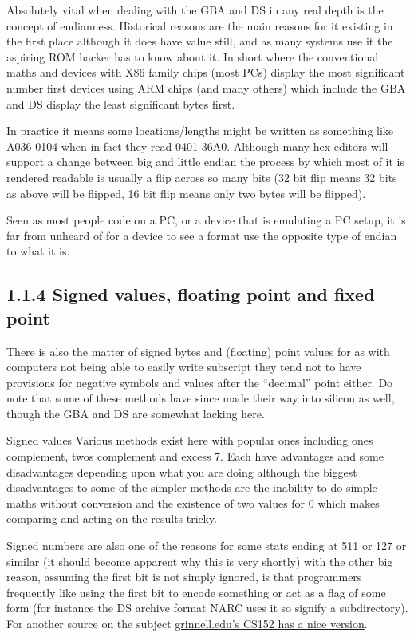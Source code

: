 \documentclass[
]{book}
\begin{document}
Absolutely vital when dealing with the GBA and DS in any real depth is the concept of endianness. Historical reasons are the main reasons for it existing in the first place although it does have value still, and as many systems use it the aspiring ROM hacker has to know about it. In short where the conventional maths and devices with X86 family chips (most PCs) display the most significant number first devices using ARM chips (and many others) which include the GBA and DS display the least significant bytes first.

In practice it means some locations/lengths might be written as something like A036 0104 when in fact they read 0401 36A0. Although many hex editors will support a change between big and little endian the process by which most of it is rendered readable is usually a flip across so many bits (32 bit flip means 32 bits as above will be flipped, 16 bit flip means only two bytes will be flipped).

Seen as most people code on a PC, or a device that is emulating a PC setup, it is far from unheard of for a device to see a format use the opposite type of endian to what it is.

\hypertarget{signed-values-floating-point-and-fixed-point}{%
\subsection{1.1.4 Signed values, floating point and fixed point}\label{signed-values-floating-point-and-fixed-point}}

There is also the matter of signed bytes and (floating) point values for as with computers not being able to easily write subscript they tend not to have provisions for negative symbols and values after the ``decimal'' point either. Do note that some of these methods have since made their way into silicon as well, though the GBA and DS are somewhat lacking here.

Signed values Various methods exist here with popular ones including ones complement, twos complement and excess 7. Each have advantages and some disadvantages depending upon what you are doing although the biggest disadvantages to some of the simpler methods are the inability to do simple maths without conversion and the existence of two values for 0 which makes comparing and acting on the results tricky.

Signed numbers are also one of the reasons for some stats ending at 511 or 127 or similar (it should become apparent why this is very shortly) with the other big reason, assuming the first bit is not simply ignored, is that programmers frequently like using the first bit to encode something or act as a flag of some form (for instance the DS archive format NARC uses it so signify a subdirectory). For another source on the subject \href{http://www.cs.grinnell.edu/~rebelsky/Courses/CS152/97F/Readings/student-binary.html}{grinnell.edu's CS152 has a nice version}.
\end{document}
